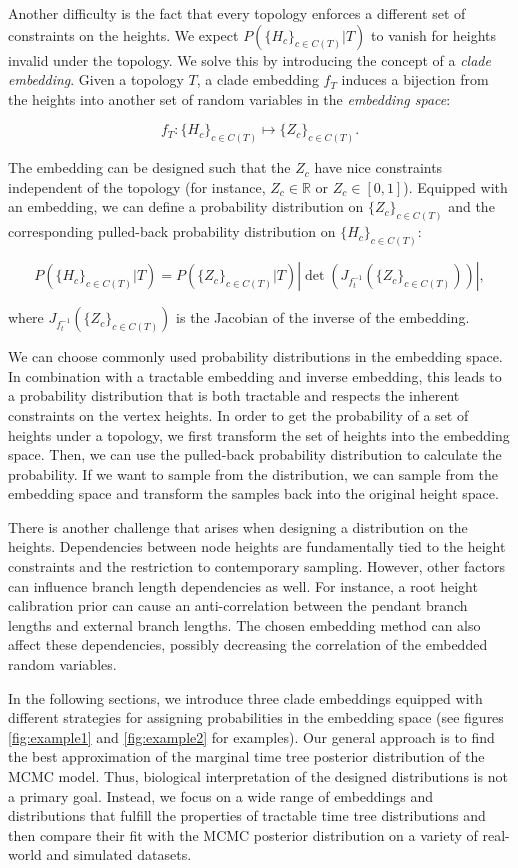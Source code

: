 \documentclass[10pt,letterpaper]{article}
\begin{document}
Another difficulty is the fact that every topology enforces a different set of constraints on the heights. We expect $P\left(\{H_c\}_{c \in C(T)} | T\right)$ to vanish for heights invalid under the topology. We solve this by introducing the concept of a \emph{clade embedding}. Given a topology $T$, a clade embedding $f_T$ induces a bijection from the heights into another set of random variables in the \emph{embedding space}:

$$
f_T: \{H_c\}_{c \in C(T)} \mapsto \{Z_c\}_{c \in C(T)}.
$$

The embedding can be designed such that the $Z_c$ have nice constraints independent of the topology (for instance, $Z_c \in \mathbb{R}$ or $Z_c \in [0, 1]$). Equipped with an embedding, we can define a probability distribution on $\{Z_c\}_{c \in C(T)}$ and the corresponding pulled-back probability distribution on $\{H_c\}_{c \in C(T)}$:

$$
P\left(\{H_c\}_{c \in C(T)} | T\right) = P\left(\{Z_c\}_{c \in C(T)} | T\right) \left| \det{\left(J_{f_t^{-1}}(\{Z_c\}_{c \in C(T)})\right)} \right|,
$$

where $J_{f_t^{-1}}(\{Z_c\}_{c \in C(T)})$ is the Jacobian of the inverse of the embedding.

We can choose commonly used probability distributions in the embedding space. In combination with a tractable embedding and inverse embedding, this leads to a probability distribution that is both tractable and respects the inherent constraints on the vertex heights. In order to get the probability of a set of heights under a topology, we first transform the set of heights into the embedding space. Then, we can use the pulled-back probability distribution to calculate the probability. If we want to sample from the distribution, we can sample from the embedding space and transform the samples back into the original height space.

There is another challenge that arises when designing a distribution on the heights. Dependencies between node heights are fundamentally tied to the height constraints and the restriction to contemporary sampling. However, other factors can influence branch length dependencies as well. For instance, a root height calibration prior can cause an anti-correlation between the pendant branch lengths and external branch lengths. The chosen embedding method can also affect these dependencies, possibly decreasing the correlation of the embedded random variables.

In the following sections, we introduce three clade embeddings equipped with different strategies for assigning probabilities in the embedding space (see figures \ref{fig:example1} and \ref{fig:example2} for examples). Our general approach is to find the best approximation of the marginal time tree posterior distribution of the MCMC model. Thus, biological interpretation of the designed distributions is not a primary goal. Instead, we focus on a wide range of embeddings and distributions that fulfill the properties of tractable time tree distributions and then compare their fit with the MCMC posterior distribution on a variety of real-world and simulated datasets.
\end{document}
